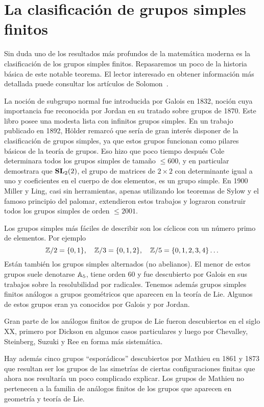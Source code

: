 \section*{La clasificación de grupos simples finitos}

Sin duda uno de los resultados más profundos de la matemática moderna es la
clasificación de los grupos simples finitos. Repasaremos un poco de la historia
básica de este notable teorema. El lector interesado en obtener información más
detallada puede consultar los artículos de Solomon~\cite{MR1824893,MR3854074}. 

La noción de subgrupo normal fue introducida por Galois en 1832, noción cuya
importancia fue reconocida por Jordan en su tratado sobre grupos de 1870. Este
libro posee una modesta lista con infinitos grupos simples. En un trabajo
publicado en 1892, H\"older remarcó que sería de gran interés disponer de la
clasificación de grupos simples, ya que estos grupos funcionan como pilares básicos de la teoría de grupos. 
Eso hizo que poco tiempo después Cole determinara todos los grupos simples de tamaño $\leq600$, y en particular
demostrara que $\mathbf{SL}_2(2)$, el grupo de matrices de $2\times 2$ con determinante
igual a uno y coeficientes en el cuerpo de dos elementos, es un grupo simple. En 1900 
Miller y Ling, casi sin herramientas, apenas utilizando los teoremas de Sylow y 
el famoso principio del palomar, 
extendieron estos trabajos y lograron construir todos los grupos
simples de orden $\leq2001$. 

Los grupos simples más fáciles de describir son los cíclicos con un número
primo de elementos. Por ejemplo
\[
	\mathbb{Z}/2=\{0,1\},\quad
	\mathbb{Z}/3=\{0,1,2\},\quad
	\mathbb{Z}/5=\{0,1,2,3,4\}\dots
\]
Están también los grupos simples alternados (no abelianos). El menor de estos grupos suele
denotarse $\mathbb{A}_5$, tiene orden 60 y fue descubierto por Galois en sus trabajos
sobre la resolubilidad por radicales. Tenemos además grupos simples 
finitos análogos a grupos geométricos que aparecen en la teoría de Lie. Algunos
de estos grupos eran ya conocidos por Galois y por Jordan. 

Gran parte de los análogos finitos de grupos de Lie fueron descubiertos en el
siglo XX, primero por Dickson en algunos casos particulares y luego por
Chevalley, Steinberg, Suzuki y Ree en forma más sistemática. 

Hay además cinco grupos ``esporádicos'' descubiertos por Mathieu en 1861 y 1873 que resultan ser los grupos de
las simetrías de ciertas configuraciones finitas que ahora nos resultaría un poco
complicado explicar. Los grupos de Mathieu no pertenecen a la familia de análogos finitos de los grupos que
aparecen en geometría y teoría de Lie. 

